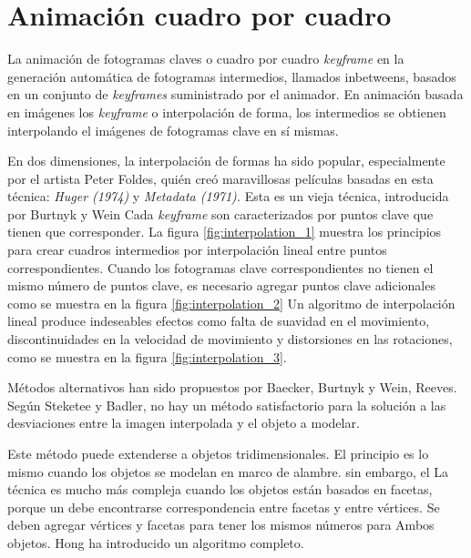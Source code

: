 \documentclass[a4paper,12pt]{report}
\begin{document}
 
\section{Animación cuadro por cuadro}
 
La animación de fotogramas claves o cuadro por cuadro \textit{keyframe} en la generación automática de
fotogramas intermedios, llamados inbetweens, basados ​​en un conjunto de \textit{keyframes}
suministrado por el animador. En animación basada en imágenes los \textit{keyframe} o
interpolación de forma, los intermedios se obtienen interpolando el
imágenes de fotogramas clave en sí mismas.\cite{Thalmann}
 
 
En dos dimensiones, la interpolación de formas ha sido popular, especialmente
por el artista Peter Foldes, quién creó maravillosas películas basadas en
esta técnica: \textit{Huger (1974)} y \textit{Metadata (1971).} Esta es un vieja
técnica, introducida por Burtnyk y Wein\cite{burtnyk_wein} Cada \textit{keyframe} son
caracterizados por puntos clave que tienen que corresponder. La figura \ref{fig:interpolation_1} muestra los
principios para crear cuadros intermedios por interpolación lineal entre
puntos correspondientes. Cuando los fotogramas clave correspondientes no tienen el
mismo número de puntos clave, es necesario agregar puntos clave adicionales como
se muestra en la figura \ref{fig:interpolation_2} Un algoritmo de interpolación lineal produce indeseables
efectos como falta de suavidad en el movimiento, discontinuidades en la velocidad
de movimiento y distorsiones en las rotaciones, como se muestra en la figura \ref{fig:interpolation_3}.
 
 
Métodos alternativos han sido propuestos por Baecker\cite{baecker}, Burtnyk y Wein\cite{burtnyk_wein2}, Reeves.\cite{reeves}
Según Steketee y Badler\cite{Steketee_Badler}, no hay un método satisfactorio para la
solución a las desviaciones entre la imagen interpolada y el objeto a modelar.
 
 
Este método puede extenderse a objetos tridimensionales. El principio
es lo mismo cuando los objetos se modelan en marco de alambre. sin embargo, el
La técnica es mucho más compleja cuando los objetos están basados ​​en facetas, porque un
debe encontrarse correspondencia entre facetas y entre vértices.
Se deben agregar vértices y facetas para tener los mismos números para
Ambos objetos. Hong\cite{Hong} ha introducido un algoritmo completo.
 
\end{document}
